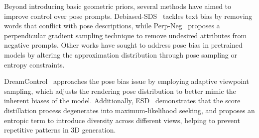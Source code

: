 Beyond introducing basic geometric priors, several methods have aimed to improve control over pose prompts. Debiased-SDS~\citep{hong2023debiasing} tackles text bias by removing words that conflict with pose descriptions, while Perp-Neg~\citep{armandpour2023re} proposes a perpendicular gradient sampling technique to remove undesired attributes from negative prompts. Other works have sought to address pose bias in pretrained models by altering the approximation distribution through pose sampling or entropy constraints.

DreamControl~\citep{huang2024dreamcontrol} approaches the pose bias issue by employing adaptive viewpoint sampling, which adjusts the rendering pose distribution to better mimic the inherent biases of the model. Additionally, ESD~\citep{wang2024taming} demonstrates that the score distillation process degenerates into maximum-likelihood seeking, and proposes an entropic term to introduce diversity across different views, helping to prevent repetitive patterns in 3D generation.